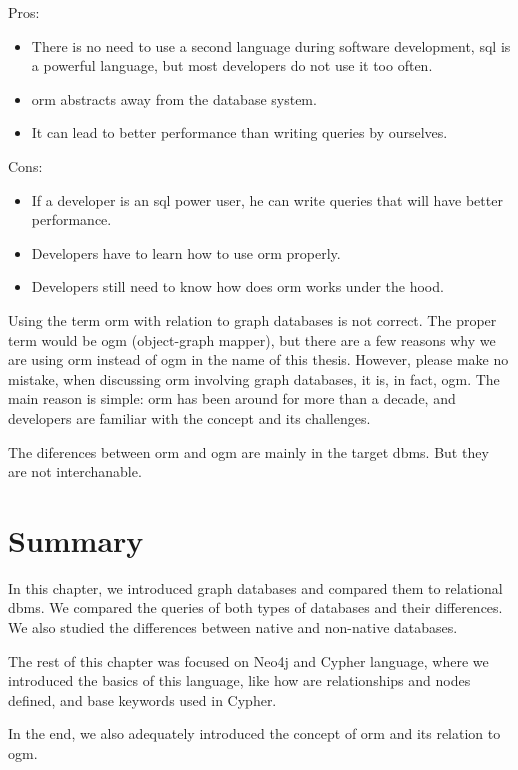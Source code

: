 \noindent Pros:
\begin{itemize}
    \item There is no need to use a second language during software development, \acrshort{sql} is a powerful language, but most developers do not use it too often.
    \item \acrshort{orm} abstracts away from the database system.
    \item It can lead to better performance than writing queries by ourselves.
\end{itemize}
Cons:
\begin{itemize}
    \item If a developer is an \acrshort{sql} power user, he can write queries that will have better performance.
    \item Developers have to learn how to use \acrshort{orm} properly.
    \item Developers still need to know how does \acrshort{orm} works under the hood.
\end{itemize}

Using the term \acrshort{orm} with relation to graph databases is not correct. The proper term would be \acrshort{ogm} (object-graph mapper),
but there are a few reasons why we are using \acrshort{orm} instead of \acrshort{ogm} in the name of this thesis. However, please make no mistake,
when discussing \acrshort{orm} involving graph databases, it is, in fact, \acrshort{ogm}.
The main reason is simple: \acrshort{orm} has been around for more than a decade, and developers are familiar with the concept and its challenges.

The diferences between \acrshort{orm} and \acrshort{ogm} are mainly in the target \acrshort{dbms}. But they are not interchanable.

\section{Summary}

In this chapter, we introduced graph databases and compared them to relational \acrshort{dbms}.
We compared the queries of both types of databases and their differences.
We also studied the differences between native and non-native databases.

The rest of this chapter was focused on Neo4j and Cypher language, where we introduced the basics of this language, like how are relationships and nodes defined,
and base keywords used in Cypher.

In the end, we also adequately introduced the concept of \acrshort{orm} and its relation to \acrshort{ogm}.
